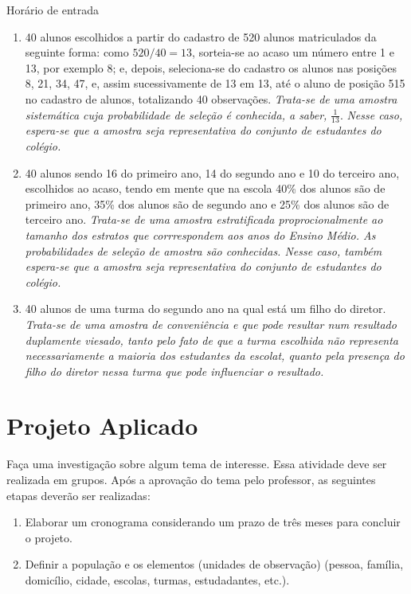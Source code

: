 {{\begin{example}{Horário de entrada}
\begin{enumerate}
\item {} 
40 alunos escolhidos a partir do cadastro de 520 alunos matriculados da seguinte forma: como \(520/40=13\), sorteia-se ao acaso um número entre 1 e 13, por exemplo 8; e, depois, seleciona-se do cadastro os alunos nas posições 8, 21, 34, 47,  e, assim sucessivamente de 13 em 13, até o aluno de posição 515 no cadastro de alunos, totalizando 40 observações. \emph{Trata-se de uma amostra sistemática cuja probabilidade de seleção é conhecida, a saber,} \(\frac{1}{13}\). \emph{Nesse caso, espera-se que a amostra seja representativa do conjunto de estudantes do colégio.}

\item {} 
40 alunos sendo 16 do primeiro ano, 14 do segundo ano e 10 do terceiro ano, escolhidos ao acaso, tendo em mente que na escola 40\% dos alunos são de primeiro ano, 35\% dos alunos são de segundo ano e 25\% dos alunos são de terceiro ano. \emph{Trata-se de uma amostra estratificada proprocionalmente ao tamanho dos estratos que corrrespondem aos anos do Ensino Médio. As probabilidades de seleção de amostra são conhecidas.  Nesse caso, também espera-se que a amostra seja representativa do conjunto de estudantes do colégio.}

\item {} 
40 alunos de uma turma do segundo ano na qual está um filho do diretor. \emph{Trata-se de uma amostra de conveniência e que pode resultar num resultado duplamente viesado, tanto pelo fato de que a turma escolhida não representa necessariamente a maioria dos estudantes da escolat, quanto pela presença do filho do diretor nessa turma que pode influenciar o resultado.}

\end{enumerate}
\end{example}


\section{Projeto Aplicado}
\label{est1-projeto-1}

Faça uma investigação sobre algum tema de interesse. Essa atividade deve ser realizada em grupos.  Após a aprovação do tema pelo professor, as seguintes etapas deverão ser realizadas:
\begin{enumerate}
\item {} 
Elaborar um cronograma considerando um prazo de três meses para concluir o projeto.

\item {} 
Definir a população e os elementos (unidades de observação) (pessoa, família, domicílio, cidade, escolas, turmas, estudadantes, etc.).


\end{enumerate}}}
